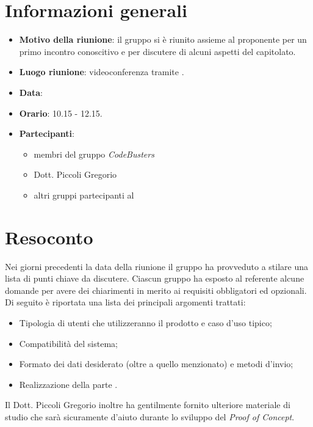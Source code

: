 \section{Informazioni generali}
\begin{itemize}
\item \textbf{Motivo della riunione}: il gruppo si è riunito assieme al proponente per un primo incontro conoscitivo e per discutere di alcuni aspetti del capitolato.
\item \textbf{Luogo riunione}: videoconferenza tramite .
\item \textbf{Data}: \Data{}
\item \textbf{Orario}: 10.15 - 12.15.
\item \textbf{Partecipanti}:
	\begin{itemize}
	\item membri del gruppo \textit{CodeBusters}
	\item Dott. Piccoli Gregorio
	\item altri gruppi partecipanti al 
	\end{itemize}
\end{itemize}

\section{Resoconto}
Nei giorni precedenti la data della riunione il gruppo ha provveduto a stilare una lista di punti chiave da discutere. Ciascun gruppo ha esposto al referente alcune domande per avere dei chiarimenti in merito ai requisiti obbligatori ed opzionali. Di seguito è riportata una lista dei principali argomenti trattati:
\begin{itemize}

\item Tipologia di utenti che utilizzeranno il prodotto e caso d'uso tipico;

\item Compatibilità del sistema;

\item Formato dei dati desiderato (oltre a quello menzionato) e metodi d'invio;

\item Realizzazione della parte .

\end{itemize}

Il Dott. Piccoli Gregorio inoltre ha gentilmente fornito ulteriore materiale di studio che sarà sicuramente d'aiuto durante lo sviluppo del \textit{Proof of Concept}.